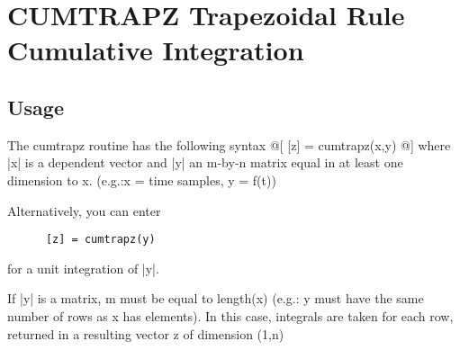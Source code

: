 \section{CUMTRAPZ Trapezoidal Rule Cumulative Integration}

\subsection{Usage}

 
 The cumtrapz routine has the following syntax
 @[
      [z] = cumtrapz(x,y)
 @]
 where |x| is a dependent vector and |y| an m-by-n matrix equal in
  at least one dimension to x. (e.g.:x = time samples, y = f(t))
 
 Alternatively, you can enter 
\begin{verbatim}
      [z] = cumtrapz(y) 
\end{verbatim}
 for a unit integration of |y|. 

 If |y| is a matrix, m must be equal to length(x) (e.g.:
 y must have the same number of rows as x has elements).
 In this case, integrals are taken for each row, returned in a
 resulting vector z of dimension (1,n)
